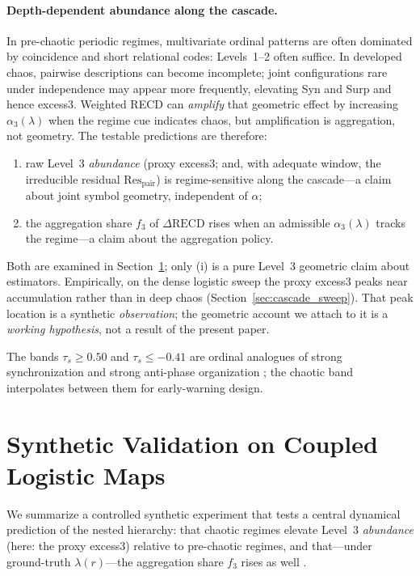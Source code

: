 \documentclass[11pt,a4paper]{article}
\begin{document}
\paragraph{Depth-dependent abundance along the cascade.}
In pre-chaotic periodic regimes, multivariate ordinal patterns are often
dominated by coincidence and short relational codes: Levels~1--2 often
suffice. In developed chaos, pairwise descriptions can become incomplete;
joint configurations rare under independence may appear more frequently,
elevating Syn and Surp and hence excess3. Weighted RECD can \emph{amplify}
that geometric effect by increasing $\alpha_3(\lambda)$ when the regime
cue indicates chaos, but amplification is aggregation, not geometry.
The testable predictions are therefore:
\begin{enumerate}[leftmargin=*,itemsep=2pt]
  \item raw Level~3 \emph{abundance} (proxy excess3; and, with adequate
  window, the irreducible residual $\mathrm{Res}_{\mathrm{pair}}$) is
  regime-sensitive along the cascade---a claim about joint symbol
  geometry, independent of $\alpha$;
  \item the aggregation share $f_3$ of $\Delta\mathrm{RECD}$ rises when
  an admissible $\alpha_3(\lambda)$ tracks the regime---a claim about
  the aggregation policy.
\end{enumerate}
Both are examined in Section~\ref{sec:validation}; only (i) is a pure
Level~3 geometric claim about estimators. Empirically, on the dense
logistic sweep the proxy excess3 peaks near accumulation rather than in
deep chaos (Section~\ref{sec:cascade_sweep}). That peak location is a
synthetic \emph{observation}; the geometric account we attach to it is a
\emph{working hypothesis}, not a result of the present paper.

The bands $\tau_s\geq 0.50$ and $\tau_s\leq -0.41$ are ordinal analogues
of strong synchronization and strong anti-phase organization
\cite{Pecora1990,Mainieri1999}; the chaotic band interpolates between
them for early-warning design.

\section{Synthetic Validation on Coupled Logistic Maps}
\label{sec:validation}


We summarize a controlled synthetic experiment that tests a central
dynamical prediction of the nested hierarchy: that chaotic regimes
elevate Level~3 \emph{abundance} (here: the proxy excess3) relative to
pre-chaotic regimes, and that---under ground-truth $\lambda(r)$---the
aggregation share $f_3$ rises as well
\cite{Padilla2026nested,Kaneko1992}.
\end{document}
